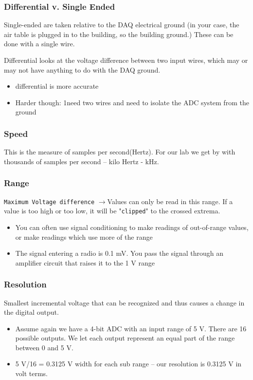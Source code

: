 \documentclass[a4paper,12pt]{article}
\newcommand{\ra}{$\rightarrow$}
\begin{document}
          \subsubsection*{Differential v. Single Ended}
          Single-ended are taken relative to the DAQ electrical ground (in your case, the air table is plugged in to the building, so the building ground.) These can be done with a single wire.\vspace{8pt}
          \par Differential looks at the voltage difference between two input wires, which may or may not have anything to do with the DAQ ground.
          \begin{itemize}
            \item differential is more accurate
            \item Harder though: 1need two wires and need to isolate the ADC system from the ground
          \end{itemize}
          \subsubsection*{Speed}
             This is the measure of samples per second(Hertz). For our lab we get by with thousands of samples per second – kilo Hertz - kHz.
          \subsubsection*{Range}
            \texttt{Maximum Voltage difference} \ra Values can only be read in this range. If a value is too high or too low, it will be "\texttt{clipped}" to the crossed extrema.
            \begin{itemize}
              \item  You can often use signal conditioning to make readings of out-of-range values, or make readings which use more of the range
              \item The signal entering a radio is 0.1 mV. You pass the signal through an amplifier circuit that raises it to the 1 V range
            \end{itemize}
          \subsubsection*{Resolution}
            Smallest incremental voltage that can be recognized and thus
            causes a change in the digital output.
            \begin{itemize}
              \item Assume again we have a 4-bit ADC with an input range of 5 V. There are 16 possible outputs. We let each output represent an equal part of the range between 0 and 5 V.
              \item 5 V/16 = 0.3125 V width for each sub range – our resolution is 0.3125 V in volt terms.
            \end{itemize}
\end{document}
